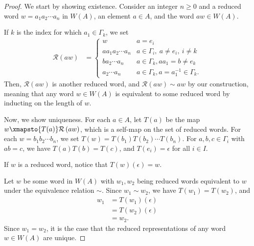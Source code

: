 \begin{proof}
  We start by showing existence. Consider an integer $n \geq 0$ and a reduced word $w = a_1a_2\cdots a_n$ in $W(A)$, an element $a\in A$, and the word $aw \in W(A)$.\newline

  If $k$ is the index for which $a_1\in \Gamma_k$, we set
  \begin{align*}
    \mathcal{R}\left(aw\right) &= \begin{cases}
      w & a = e_i\\
      aa_1a_2\cdots a_n & a\in \Gamma_i,~a\neq e_i,~i\neq k\\
      ba_2\cdots a_n & a\in \Gamma_k,aa_1 = b\neq e_k\\
      a_2\cdots a_n & a\in \Gamma_k, a = a_1^{-1} \in \Gamma_k.
    \end{cases}
  \end{align*}
  Then, $\mathcal{R}\left(aw\right)$ is another reduced word, and $\mathcal{R}\left(aw\right) \sim aw$ by our construction, meaning that any word $w\in W(A)$ is equivalent to some reduced word by inducting on the length of $w$.\newline

  Now, we show uniqueness. For each $a\in A$, let $T\left(a\right) $ be the map $ w\xmapsto{T(a)} \mathcal{R}\left(aw\right)$, which is a self-map on the set of reduced words. For each $w = b_1b_2\cdots b_n$, we set $T(w) = T\left(b_1\right)T\left(b_2\right)\cdots T\left(b_n\right)$. For $a,b,c\in \Gamma_i$ with $ab = c$, we have $T\left(a\right)T\left(b\right) = T\left(c\right)$, and $T\left(e_i\right) = \epsilon$ for all $i\in I$.\newline

  If $w$ is a reduced word, notice that $T\left(w\right)\left(\epsilon\right) = w$.\newline

  Let $w$ be some word in $W(A)$ with $w_1,w_2$ being reduced words equivalent to $w$ under the equivalence relation $\sim$. Since $w_1\sim w_2$, we have $T\left(w_1\right) = T\left(w_2\right)$, and
  \begin{align*}
    w_1 &= T\left(w_1\right)\left(\epsilon\right)\\
        &= T\left(w_2\right)\left(\epsilon\right)\\
        &= w_2.
  \end{align*}
  Since $w_1 = w_2$, it is the case that the reduced representations of any word $w\in W(A)$ are unique.
\end{proof}
